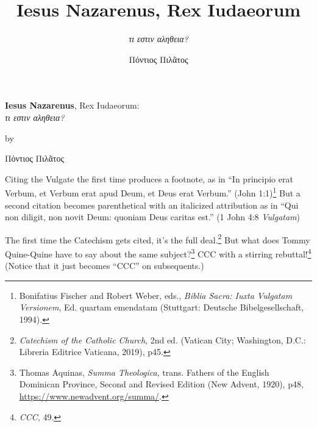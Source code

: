 \documentclass[
    12pt,
    letterpaper,
    oneside,
    noraggedright
]{turabian-researchpaper}
\title{{\textbf{Iesus Nazarenus}, Rex Iudaeorum}}
\subtitle{{\emph{τι εστιν αληθεια?}}}
\author{{Πόντιος Πιλᾶτος}}
\begin{document}
    
        \begin{center}

        \thispagestyle{empty}
        \vspace*{1in}
        \begin{singlespace}
                {\textbf{Iesus Nazarenus}, Rex Iudaeorum}:\\
        {\emph{τι εστιν αληθεια?}}
                \end{singlespace}
        \vspace{2in - \baselineskip}

        by
        \vspace{2in - \baselineskip}

        {Πόντιος Πιλᾶτος}

        \vspace{2in - \baselineskip}

        \end{center}
        \newpage
    

Citing the Vulgate the first time produces a footnote, as in ``In
principio erat Verbum, et Verbum erat apud Deum, et Deus erat Verbum.''
{(John 1:1)\footnote{Bonifatius Fischer and Robert Weber, eds.,
  \emph{Biblia Sacra: Iuxta Vulgatam Versionem}, Ed. quartam emendatam
  (Stuttgart: Deutsche Bibelgesellschaft, 1994).}} But a second citation
becomes parenthetical with an italicized attribution as in ``Qui non
diligit, non novit Deum: quoniam Deus caritas est.'' {(1 John 4:8{
\emph{Vulgatam}})}

The first time the Catechism gets cited, it's the full deal.\footnote{\emph{Catechism
  of the Catholic Church}, 2nd ed. (Vatican City; Washington, D.C.:
  Libreria Editrice Vaticana, 2019), p45.} But what does Tommy
Quine-Quine have to say about the same subject?\footnote{Thomas Aquinas,
  \emph{Summa Theologica}, trans. Fathers of the English Dominican
  Province, Second and Revised Edition (New Advent, 1920), p48,
  \url{https://www.newadvent.org/summa/}.} CCC with a stirring
rebuttal!\footnote{\emph{CCC}, 49.} (Notice that it just becomes ``CCC''
on subsequents.)
\end{document}
